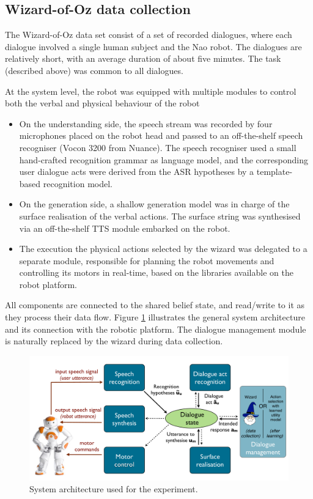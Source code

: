 \subsection{Wizard-of-Oz data collection}
\label{sec:wozlearning-experiments-woz}

The Wizard-of-Oz data set consist of a set of recorded dialogues, where each dialogue involved a single human subject and the Nao robot.  The dialogues are relatively short, with an average duration of about five minutes. The task (described above) was common to all dialogues.


At the system level, the robot was equipped with multiple modules to control both the verbal and physical behaviour of the robot \begin{itemize}
\item On the understanding side, the speech stream was recorded by four microphones placed on the robot head and passed to an off-the-shelf speech recogniser (Vocon 3200 from Nuance).  The speech recogniser used a small hand-crafted recognition grammar as language model, and the corresponding user dialogue acts were derived from the ASR hypotheses by a template-based recognition model. 
\item On the generation side, a shallow generation model was in charge of the surface realisation of the verbal actions.  The surface string was synthesised via an off-the-shelf TTS module embarked on the robot.
\item The execution the physical actions selected by the wizard was delegated to a separate module, responsible for  planning the robot movements and controlling its motors in real-time, based on the libraries available on the robot platform. 
\end{itemize}

All components are connected to the shared belief state, and read/write to it as they process their data flow.  Figure \ref{fig:exp1_architecture} illustrates the general system architecture and its connection with the robotic platform. The dialogue management module is naturally replaced by the wizard during data collection. 

\begin{figure}[h]
\begin{center}
\includegraphics[scale=0.30]{imgs/exp1_architecture.pdf}
\end{center}
\caption{System architecture used for the experiment.}
\label{fig:exp1_architecture}
\end{figure}

